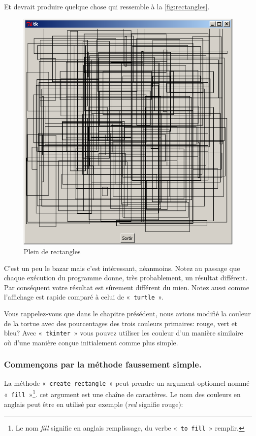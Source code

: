 Et devrait produire quelque chose qui ressemble à la \autoref{fig:rectangles}.
\begin{figure}[h!]
\centering
\includegraphics[scale=0.4]{images/rectangles}
\caption{Plein de rectangles}\label{fig:rectangles}
\end{figure}

C'est un peu le bazar mais c'est intéressant, néanmoins.
Notez au passage que chaque exécution du programme donne, très probablement, un résultat différent. Par conséquent votre résultat est sûrement différent du mien. Notez aussi comme l'affichage est rapide comparé à celui de «~\texttt{turtle}~».

Vous rappelez-vous que dans le chapitre présédent, nous avions modifié la couleur de la tortue avec des pourcentages des trois couleurs primaires: rouge, vert et bleu? Avec «~\texttt{tkinter}~» vous pouvez utiliser les couleur d'un manière similaire où d'une manière conçue initialement comme plus simple.

\subsubsection*{Commençons par la méthode faussement simple.}
La méthode «~\texttt{create\_rectangle}~» peut prendre un argument optionnel nommé «~\texttt{fill}~»\footnote{Le nom \emph{fill} signifie en anglais remplissage, du verbe «~\texttt{to fill}~» remplir.}. cet argument est une chaîne de caractères. Le nom des couleurs en anglais peut être en utilisé par exemple (\emph{red} signifie rouge):

